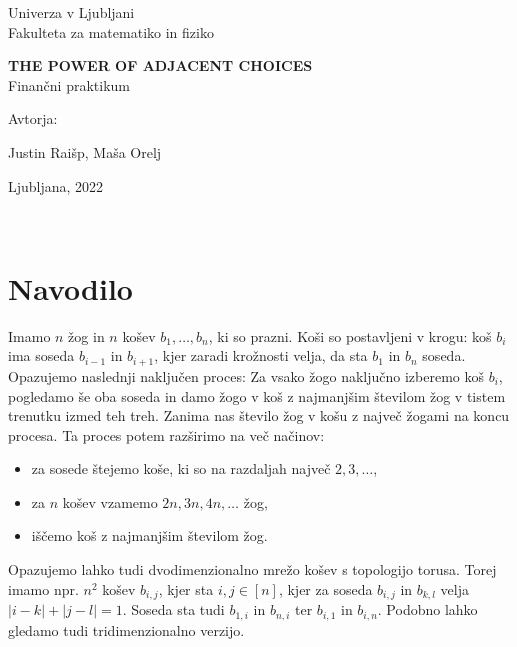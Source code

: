 \documentclass[a4paper, 11pt]{article}
\begin{document}
\thispagestyle{empty}
\begin{center}
\begin{minipage}{0.75\linewidth}
    \centering
    {\Large Univerza v Ljubljani \\ Fakulteta za matematiko in fiziko}
    \\
    \vspace{7cm}

    {\uppercase{\Large \textbf{The power of adjacent choices}}} \\ Finančni praktikum \\
    \vspace{3cm}

    Avtorja:\\
    {\Large Justin Raišp, Maša Orelj\par}
    \vspace{7cm}

    {\Large Ljubljana, 2022}
\end{minipage}
\end{center}


\newpage
\tableofcontents
\newpage
\
\section{Navodilo}

Imamo $n$ žog in $n$ košev $b_1, \dots , b_n$, ki so prazni. Koši so postavljeni v krogu: koš $b_i$ ima soseda 
$b_{i-1}$ in $b_{i+1}$, kjer zaradi krožnosti velja, da sta $b_1$ in $b_n$ soseda.
Opazujemo naslednji naključen proces: Za vsako žogo naključno izberemo koš $b_i$, pogledamo še oba soseda in damo žogo 
v koš z najmanjšim številom žog v tistem trenutku izmed teh treh. Zanima nas število žog v košu z največ žogami na koncu procesa. 
Ta proces potem razširimo na več načinov:
\begin{itemize}
    \item za sosede štejemo koše, ki so na razdaljah največ $2, 3, \dots$,
    \item za $n$ košev vzamemo $2n, 3n, 4n, \dots$ žog,
    \item iščemo koš z najmanjšim številom žog.
\end{itemize}  
Opazujemo lahko tudi dvodimenzionalno mrežo košev s topologijo torusa. Torej imamo npr. $n^2$ košev $b_{i,j}$, kjer sta 
$i, j \in [n]$, kjer za soseda $b_{i,j}$ in $b_{k,l}$ velja $|i - k| + |j - l| = 1$. Soseda sta tudi
$b_{1,i}$ in $b_{n,i}$  ter $b_{i,1}$ in $b_{i,n}$. Podobno lahko gledamo tudi tridimenzionalno verzijo.
\end{document}
